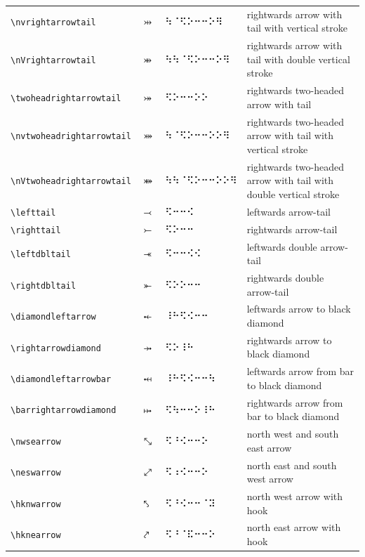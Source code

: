\documentclass[oneside]{article}
\begin{document}
\begin{longtable}{llll}
\verb|\nvrightarrowtail| & $\nvrightarrowtail$ &   ⠳⠈⠫⠕⠒⠒⠕⠻   & {rightwards arrow with tail with vertical stroke} \\[2ex]
\verb|\nVrightarrowtail| & $\nVrightarrowtail$ &   ⠳⠳⠈⠫⠕⠒⠒⠕⠻   & {rightwards arrow with tail with double vertical stroke} \\[2ex]
\verb|\twoheadrightarrowtail| & $\twoheadrightarrowtail$ &   ⠫⠕⠒⠒⠕⠕   & {rightwards two-headed arrow with tail} \\[2ex]
\verb|\nvtwoheadrightarrowtail| & $\nvtwoheadrightarrowtail$ &   ⠳⠈⠫⠕⠒⠒⠕⠕⠻   & {rightwards two-headed arrow with tail with vertical stroke} \\[2ex]
\verb|\nVtwoheadrightarrowtail| & $\nVtwoheadrightarrowtail$ &   ⠳⠳⠈⠫⠕⠒⠒⠕⠕⠻   & \begin{minipage}[t]{8cm}{rightwards two-headed arrow with tail with double vertical stroke}
\end{minipage}\\[4ex]
\verb|\lefttail| & $\lefttail$ &   ⠫⠒⠒⠪   & {leftwards arrow-tail} \\[2ex]
\verb|\righttail| & $\righttail$ &   ⠫⠕⠒⠒   & {rightwards arrow-tail} \\[2ex]
\verb|\leftdbltail| & $\leftdbltail$ &   ⠫⠒⠒⠪⠪   & {leftwards double arrow-tail} \\[2ex]
\verb|\rightdbltail| & $\rightdbltail$ &   ⠫⠕⠕⠒⠒   & {rightwards double arrow-tail} \\[2ex]
\verb|\diamondleftarrow| & $\diamondleftarrow$ &   ⠸⠓⠫⠪⠒⠒   & {leftwards arrow to black diamond} \\[2ex]
\verb|\rightarrowdiamond| & $\rightarrowdiamond$ &   ⠫⠕⠸⠓   & {rightwards arrow to black diamond} \\[2ex]
\verb|\diamondleftarrowbar| & $\diamondleftarrowbar$ &   ⠸⠓⠫⠪⠒⠒⠳   & {leftwards arrow from bar to black diamond} \\[2ex]
\verb|\barrightarrowdiamond| & $\barrightarrowdiamond$ &   ⠫⠳⠒⠒⠕⠸⠓   & {rightwards arrow from bar to black diamond} \\[2ex]
\verb|\nwsearrow| & $\nwsearrow$ &   ⠫⠘⠪⠒⠒⠕   & {north west and south east arrow} \\[2ex]
\verb|\neswarrow| & $\neswarrow$ &   ⠫⠰⠪⠒⠒⠕   & {north east and south west arrow} \\[2ex]
\verb|\hknwarrow| & $\hknwarrow$ &   ⠫⠘⠪⠒⠒⠈⠽   & {north west arrow with hook} \\[2ex]
\verb|\hknearrow| & $\hknearrow$ &   ⠫⠘⠈⠯⠒⠒⠕   & {north east arrow with hook} \\[2ex]

\end{longtable}
\end{document}
